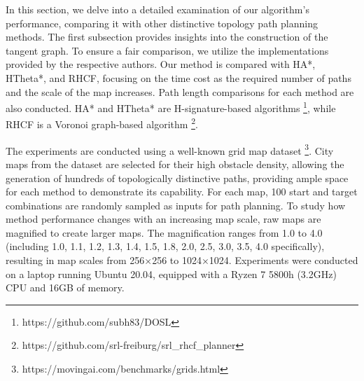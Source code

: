 \documentclass[lettersize,journal]{IEEEtran}
\begin{document}


In this section, we delve into a detailed examination of our algorithm's performance, comparing it with other distinctive topology path planning methods. The first subsection provides insights into the construction of the tangent graph. To ensure a fair comparison, we utilize the implementations provided by the respective authors. Our method is compared with HA*, HTheta*, and RHCF, focusing on the time cost as the required number of paths and the scale of the map increases. Path length comparisons for each method are also conducted. HA* and HTheta* are H-signature-based algorithms \footnote{https://github.com/subh83/DOSL}, while RHCF is a Voronoi graph-based algorithm \footnote{https://github.com/srl-freiburg/srl\_rhcf\_planner}.

The experiments are conducted using a well-known grid map dataset \cite{sturtevant2012benchmarks} \footnote{https://movingai.com/benchmarks/grids.html}. City maps from the dataset are selected for their high obstacle density, allowing the generation of hundreds of topologically distinctive paths, providing ample space for each method to demonstrate its capability. For each map, 100 start and target combinations are randomly sampled as inputs for path planning. To study how method performance changes with an increasing map scale, raw maps are magnified to create larger maps. The magnification ranges from 1.0 to 4.0 (including 1.0, 1.1, 1.2, 1.3, 1.4, 1.5, 1.8, 2.0, 2.5, 3.0, 3.5, 4.0 specifically), resulting in map scales from 256$\times$256 to 1024$\times$1024. Experiments were conducted on a laptop running Ubuntu 20.04, equipped with a Ryzen 7 5800h (3.2GHz) CPU and 16GB of memory.
\end{document}
